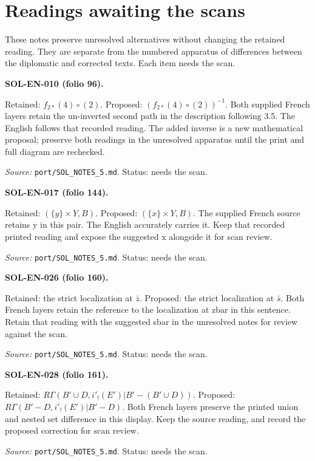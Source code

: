 \section*{Readings awaiting the scans}
\begingroup\small
These notes preserve unresolved alternatives without changing the retained reading. They are separate from the numbered apparatus of differences between the diplomatic and corrected texts. Each item needs the scan.

\medskip\noindent\textbf{SOL-EN-010 (folio 96).}\par
Retained: $f_{2*}(4)\circ(2)$. Proposed: $(f_{2*}(4)\circ(2))^{-1}$.
Both supplied French layers retain the un-inverted second path in the description following 3.5. The English follows that recorded reading. The added inverse is a new mathematical proposal; preserve both readings in the unresolved apparatus until the print and full diagram are rechecked.
\par\noindent\textit{Source: }\texttt{port/SOL\_NOTES\_5.md}. Status: needs the scan.

\medskip\noindent\textbf{SOL-EN-017 (folio 144).}\par
Retained: $(\{y\}\times Y,B)$. Proposed: $(\{x\}\times Y,B)$.
The supplied French source retains y in this pair. The English accurately carries it. Keep that recorded printed reading and expose the suggested x alongside it for scan review.
\par\noindent\textit{Source: }\texttt{port/SOL\_NOTES\_5.md}. Status: needs the scan.

\medskip\noindent\textbf{SOL-EN-026 (folio 160).}\par
Retained: the strict localization at $\bar z$. Proposed: the strict localization at $\bar s$.
Both French layers retain the reference to the localization at zbar in this sentence. Retain that reading with the suggested sbar in the unresolved notes for review against the scan.
\par\noindent\textit{Source: }\texttt{port/SOL\_NOTES\_5.md}. Status: needs the scan.

\medskip\noindent\textbf{SOL-EN-028 (folio 161).}\par
Retained: $R\Gamma(B'\cup D,i'_!(E')|B'-(B'\cup D))$. Proposed: $R\Gamma(B'-D,i'_!(E')|B'-D)$.
Both French layers preserve the printed union and nested set difference in this display. Keep the source reading, and record the proposed correction for scan review.
\par\noindent\textit{Source: }\texttt{port/SOL\_NOTES\_5.md}. Status: needs the scan.

